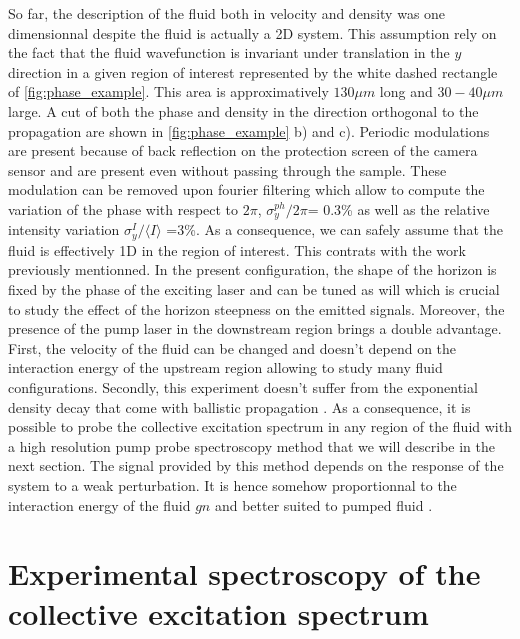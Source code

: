 So far, the description of the fluid both in velocity and density was one dimensionnal despite the fluid is actually a 2D system. This assumption
rely on the fact that the fluid wavefunction is invariant under translation in the $y$ direction in a given region of interest represented by the white dashed rectangle of \autoref{fig:phase_example}. This area is approximatively $130 \mu m$ long and $30-40 \mu m $ large. 
A cut of both the phase and density in the direction orthogonal to the propagation are shown in \autoref{fig:phase_example} b) and c). Periodic modulations are present because of back reflection on the protection screen of the camera sensor and are present even without passing through the sample. These modulation can be removed
upon fourier filtering which allow to compute the variation of the phase with respect to $2\pi$,  $\sigma_y^{ph}/2\pi$= 0.3\% as well as the relative intensity variation $\sigma_y^I/\langle I \rangle$ =3\%. As a consequence,
we can safely assume that the fluid is effectively 1D in the region of interest. This contrats with the work \cite{nguyen_acoustic_2015} previously mentionned. In the present configuration, the shape of the horizon is fixed by the phase of the exciting laser and can be tuned as will which is crucial to
study the effect of the horizon steepness on the emitted signals. Moreover, the presence of the pump laser in the downstream region brings a double advantage. First, the velocity of the fluid can be changed and doesn't depend on the interaction energy of the upstream region allowing to study many fluid configurations.
Secondly, this experiment doesn't suffer from the exponential density decay that come with ballistic propagation \cite{long_range_ballistic_2013}. As a consequence, it is possible to probe the collective excitation spectrum in any region of the fluid with a high resolution pump probe spectroscopy method that we will describe in the next section. The signal 
provided by this method depends on the response of the system to a weak perturbation. It is hence somehow proportionnal to the interaction energy of the fluid $gn$ and better suited to pumped fluid \cite{claude_high-resolution_2022}.

\section{Experimental spectroscopy of the collective excitation spectrum}

